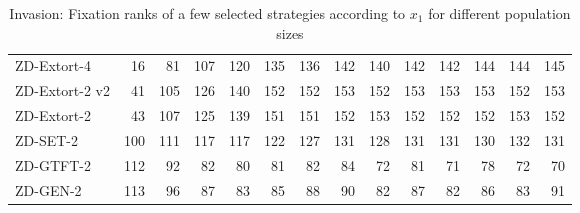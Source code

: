 \documentclass[10pt,letterpaper]{article}
\begin{document}
\begin{table}[!hbtp]
{\begin{tabular}{lrrrrrrrrrrrrr}
        \midrule
                  ZD-Extort-4 &   16 &   81 &  107 &  120 &  135 &  136 &  142 &  140 &  142 &  142 &  144 &  144 &  145 \\
               ZD-Extort-2 v2 &   41 &  105 &  126 &  140 &  152 &  152 &  153 &  152 &  153 &  153 &  153 &  152 &  153 \\
                  ZD-Extort-2 &   43 &  107 &  125 &  139 &  151 &  151 &  152 &  153 &  152 &  152 &  152 &  153 &  152 \\
                     ZD-SET-2 &  100 &  111 &  117 &  117 &  122 &  127 &  131 &  128 &  131 &  131 &  130 &  132 &  131 \\
                    ZD-GTFT-2 &  112 &   92 &   82 &   80 &   81 &   82 &   84 &   72 &   81 &   71 &   78 &   72 &   70 \\
                     ZD-GEN-2 &  113 &   96 &   87 &   83 &   85 &   88 &   90 &   82 &   87 &   82 &   86 &   83 &   91 \\
        \bottomrule
        \end{tabular}
    }
    \caption{Invasion: Fixation ranks of a few selected strategies according to \(x_1\) for different
    population sizes}
    \label{tbl:ranks_v_size_invade}
\end{table}
\end{document}
